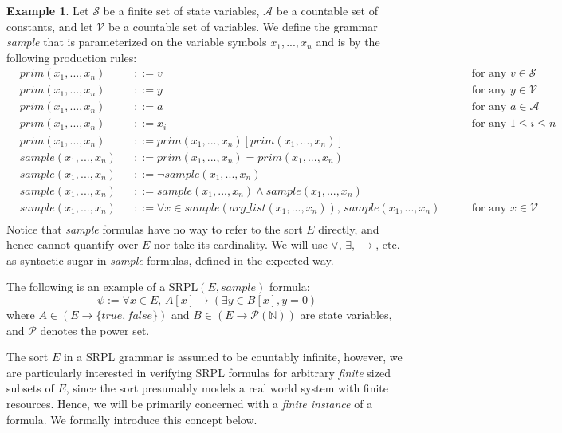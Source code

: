 \documentclass[12pt]{article}
\theoremstyle{definition}
\newtheorem{example}{Example}
\theoremstyle{remark}
\newcommand{\SRPL}{\text{SRPL}}
\begin{document}
\begin{example}
  Let $\mathcal{S}$ be a finite set of state variables, $\mathcal{A}$ be a countable set of constants, and let $\mathcal{V}$ be a countable set of variables.  We define the grammar \textit{sample} that is parameterized on the variable symbols $x_1,...,x_n$ and is by the following production rules:
  \begin{align*}
    &prim(x_1,...,x_n)& &::= v \qquad &\text{for any } v \in \mathcal{S}\\
    &prim(x_1,...,x_n)& &::= y \qquad &\text{for any } y \in \mathcal{V}\\
    &prim(x_1,...,x_n)& &::= a \qquad &\text{for any } a \in \mathcal{A}\\
    &prim(x_1,...,x_n)& &::= x_i \qquad &\text{for any } 1 \leq i \leq n\\
    &prim(x_1,...,x_n)& &::= prim(x_1,...,x_n)[prim(x_1,...,x_n)]\\
    &sample(x_1,...,x_n)& &::= prim(x_1,...,x_n) = prim(x_1,...,x_n)\\
    &sample(x_1,...,x_n)& &::= \neg sample(x_1,...,x_n)\\
    &sample(x_1,...,x_n)& &::= sample(x_1,...,x_n) \land sample(x_1,...,x_n)\\
    &sample(x_1,...,x_n)& &::= \forall x \in sample(arg\_list(x_1,...,x_n)), \, sample(x_1,...,x_n) \qquad &\text{for any } x \in \mathcal{V}\\
  \end{align*}
  Notice that \textit{sample} formulas have no way to refer to the sort $E$ directly, and hence cannot quantify over $E$ nor take its cardinality.  We will use $\lor$, $\exists$, $\rightarrow$, etc. as syntactic sugar in \textit{sample} formulas, defined in the expected way.

  The following is an example of a $\SRPL(E,sample)$ formula:
  $$\psi := \forall x \in E, \, A[x] \rightarrow (\exists y \in B[x], y = 0)$$
  where $A \in (E \to \{true,false\})$ and $B \in (E \to \mathcal{P}(\mathbb{N}))$ are state variables, and $\mathcal{P}$ denotes the power set.
\end{example}

The sort $E$ in a SRPL grammar is assumed to be countably infinite, however, we are particularly interested in verifying SRPL formulas for arbitrary \textit{finite} sized subsets of $E$, since the sort presumably models a real world system with finite resources.  Hence, we will be primarily concerned with a \textit{finite instance} of a formula.  We formally introduce this concept below.
\end{document}
